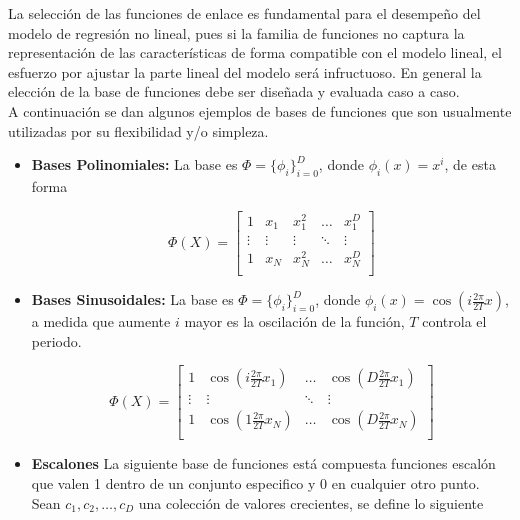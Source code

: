 La selección de las funciones de enlace es fundamental para el desempeño del modelo de regresión no lineal, pues si la familia de funciones no captura la representación de las características de forma compatible con el modelo lineal, el esfuerzo por ajustar la parte lineal del modelo será infructuoso. En general la elección de la base de funciones debe ser diseñada y evaluada caso a caso.\\

A continuación se dan algunos ejemplos de bases de funciones que son usualmente utilizadas por su flexibilidad y/o simpleza.

\begin{itemize}
    \item{\textbf{Bases Polinomiales:}}
    La base es $\Phi=\{\phi_i\}_{i=0}^D$, donde $\phi_i(x)=x^i$, de esta forma
    
    \begin{equation}
        \Phi(X) = \left[ \begin{matrix} 1 & x_1 & x_1^2 & \ldots & x_1^D\\
        \vdots & \vdots & \vdots & \ddots & \vdots \\
        1 & x_N & x_N^2 & \ldots & x_N^D\\
        \end{matrix} \right]
    \end{equation}
    
    \item{\textbf{Bases Sinusoidales:}}
    La base es $\Phi=\{\phi_i\}_{i=0}^D$, donde 
    $\phi_i(x)=\cos(i\frac{2\pi}{2T}x)$, a medida que aumente $i$ mayor es la oscilación de la función, $T$ controla el periodo.
    
    \begin{equation}
        \Phi(X) = \left[ \begin{matrix}
        1 & \cos(i\frac{2\pi}{2T}x_1) & \ldots & \cos(D\frac{2\pi}{2T}x_1)\\
        \vdots & \vdots  & \ddots & \vdots \\
        1 & \cos(1\frac{2\pi}{2T}x_N) & \ldots & \cos(D\frac{2\pi}{2T}x_N)\\
        \end{matrix} \right]
    \end{equation}
    
    \item{\textbf{Escalones}}
    La siguiente base de funciones está compuesta funciones escalón que valen 1 dentro de un conjunto especifico y 0 en cualquier otro punto. Sean $c_1,c_2, \ldots,c_D$ una colección de valores crecientes, se define lo siguiente
    

\end{itemize}
